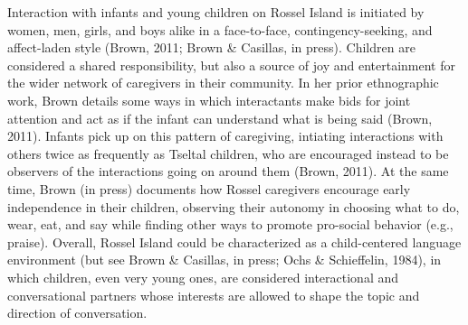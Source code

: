 \documentclass[,man,floatsintext]{apa6}
\begin{document}
Interaction with infants and young children on Rossel Island is
initiated by women, men, girls, and boys alike in a face-to-face,
contingency-seeking, and affect-laden style (Brown, 2011; Brown \&
Casillas, in press). Children are considered a shared responsibility,
but also a source of joy and entertainment for the wider network of
caregivers in their community. In her prior ethnographic work, Brown
details some ways in which interactants make bids for joint attention
and act as if the infant can understand what is being said (Brown,
2011). Infants pick up on this pattern of caregiving, intiating
interactions with others twice as frequently as Tseltal children, who
are encouraged instead to be observers of the interactions going on
around them (Brown, 2011). At the same time, Brown (in press) documents
how Rossel caregivers encourage early independence in their children,
observing their autonomy in choosing what to do, wear, eat, and say
while finding other ways to promote pro-social behavior (e.g., praise).
Overall, Rossel Island could be characterized as a child-centered
language environment (but see Brown \& Casillas, in press; Ochs \&
Schieffelin, 1984), in which children, even very young ones, are
considered interactional and conversational partners whose interests are
allowed to shape the topic and direction of conversation.
\end{document}
